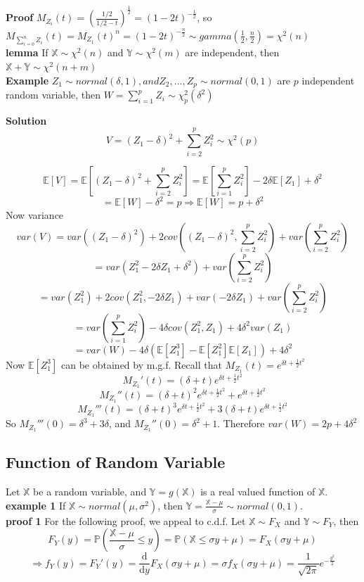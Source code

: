 \documentclass[a4paper,12pt]{article}
\begin{document}
\textbf{Proof} $M_{Z_i}(t) = (\frac{1/2}{1/2 - t})^{\frac{1}{2}} = (1-2t)^{-\frac{1}{2}}$, so $M_{\sum_{i=0}^n Z_i}(t) = M_{Z_1}(t)^n = (1-2t)^{-\frac{n}{2}} \sim gamma(\frac{1}{2}, \frac{n}{2}) = \chi^2(n)$\\

\textbf{lemma} If $\mathbb{X} \sim \chi^2(n)$ and $\mathbb{Y} \sim \chi^2(m)$ are independent, then $\mathbb{X}+\mathbb{Y} \sim \chi^2(n+m)$\\

\textbf{Example} $Z_1 \sim normal(\delta, 1), and Z_2, ..., Z_p \sim normal(0, 1)$ are $p$ independent random variable, then $W = \sum_{i=1}^p Z_i \sim \chi^2_p(\delta^2)$

\textbf{Solution}
$$V = (Z_1 - \delta)^2 + \sum_{i=2}^p Z_i^2 \sim \chi^2(p)$$

$$\mathbb{E}[V] = \mathbb{E}[ (Z_1 - \delta)^2 + \sum_{i=2}^p Z_i^2 ] = \mathbb{E}[\sum_{i=1}^p Z_i^2] - 2\delta\mathbb{E}[Z_1] + \delta^2$$
$$= \mathbb{E}[W] - \delta^2 = p \Rightarrow \mathbb{E}[W] = p + \delta^2$$
Now variance
$$var(V) = var( (Z_1-\delta)^2 ) + 2cov( (Z_1-\delta)^2, \sum_{i=2}^p Z_i^2 ) + var( \sum_{i=2}^p Z_i^2 )$$
$$= var(Z_1^2 -2\delta Z_1 + \delta^2) + var( \sum_{i=2}^p Z_i^2 )$$
$$= var(Z_1^2)+2cov(Z_1^2, -2\delta Z_1)+var(-2\delta Z_1) + var( \sum_{i=2}^p Z_i^2 )$$
$$= var(\sum_{i=1}^p Z_i^2) -4\delta cov(Z_1^2, Z_1) + 4\delta^2 var(Z_1)$$
$$= var(W) -4\delta(\mathbb{E}[Z_1^3]-\mathbb{E}[Z_1^2]\mathbb{E}[Z_1])+4\delta^2$$
Now $\mathbb{E}[Z_1^3]$ can be obtained by m.g.f. Recall that $M_{Z_1}(t) = e^{\delta t + \frac{1}{2}t^2}$
$$M_{Z_1}'(t) = (\delta+t)e^{\delta t + \frac{1}{2}t^2}$$
$$M_{Z_1}''(t) = (\delta+t)^2e^{\delta t + \frac{1}{2}t^2}+e^{\delta t + \frac{1}{2}t^2}$$
$$M_{Z_1}'''(t) = (\delta+t)^3e^{\delta t + \frac{1}{2}t^2}+3(\delta+t)e^{\delta t + \frac{1}{2}t^2}$$
So $M_{Z_1}'''(0) = \delta^3+3\delta$, and $M_{Z_1}''(0) = \delta^2 + 1$. Therefore $var(W) = 2p+4\delta^2$
\subsection{Function of Random Variable}
Let $\mathbb{X}$ be a random variable, and $\mathbb{Y} = g(\mathbb{X})$ is a real valued function of $\mathbb{X}$.\\

\textbf{example 1}
If $\mathbb{X} \sim normal(\mu, \sigma^2)$, then $\mathbb{Y} = \frac{\mathbb{X}-\mu}{\sigma} \sim normal(0, 1)$.\\

\textbf{proof 1} For the following proof, we appeal to c.d.f. Let $\mathbb{X} \sim F_X$ and $\mathbb{Y} \sim F_Y$, then
$$F_Y(y) = \mathbb{P}( \frac{\mathbb{X}-\mu}{\sigma} \leq y ) = \mathbb{P}( \mathbb{X} \leq \sigma y + \mu ) = F_X( \sigma y + \mu )$$
$$\Rightarrow f_Y(y) = F_Y'(y) = \frac{\mathrm{d}}{\mathrm{d}y}F_X( \sigma y + \mu ) = \sigma f_X(  \sigma y + \mu ) = \frac{1}{\sqrt{2\pi}}e^{-\frac{y^2}{2}}$$
\end{document}
